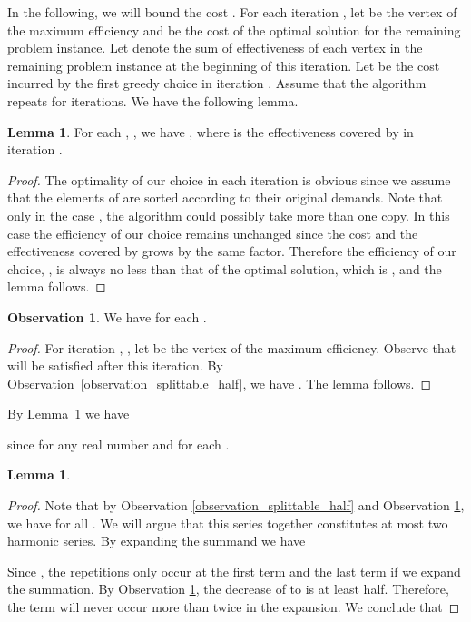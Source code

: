 \documentclass[a4paper,11pt]{article}
\theoremstyle{definition}
\newtheorem{observation}{Observation}
\newtheorem{lemma}[theorem]{Lemma}
\begin{document}
\smallskip

In the following, we will bound the cost .
For each iteration , let  be the vertex of the maximum efficiency and  be the cost of the optimal solution for the remaining problem instance. Let  denote the sum of effectiveness of each vertex in the remaining problem instance at the beginning of this iteration.
Let  be the cost incurred by the first greedy choice in iteration .
Assume that the algorithm repeats for  iterations. We have the following lemma.

\begin{lemma} \label{lemma_splittable_greedy_choice}
For each , , we have , where  is the effectiveness covered by  in iteration .
\end{lemma}

\begin{proof}
The optimality of our choice in each iteration is obvious since we assume that the elements of  are sorted according to their original demands. Note that only in the case , the algorithm could possibly take more than one copy. 
In this case the efficiency of our choice remains unchanged since the cost and the effectiveness covered by  grows by the same factor. Therefore the efficiency of our choice, , is always no less than that of the optimal solution, which is , and the lemma follows.
\end{proof}

\begin{observation} \label{observation_splittable_n_decrease}
We have  for each .
\end{observation}

\begin{proof}
For iteration , , let  be the vertex of the maximum efficiency. Observe that  will be satisfied after this iteration. By Observation~\ref{observation_splittable_half}, we have . The lemma follows.
\end{proof}

\smallskip

By Lemma~\ref{lemma_splittable_greedy_choice} we have 

since  for any real number  and  for each .

\begin{lemma}

\end{lemma}

\begin{proof}
Note that by Observation \ref{observation_splittable_half} and Observation \ref{observation_splittable_n_decrease}, we have  for all . We will argue that this series together constitutes at most two harmonic series. By expanding the summand we have 

Since , the repetitions only occur at the first term and the last term if we expand the summation. By Observation \ref{observation_splittable_n_decrease}, the decrease of  to  is at least half. Therefore, the term  will never occur more than twice in the expansion. We conclude that

\end{proof}
\end{document}
